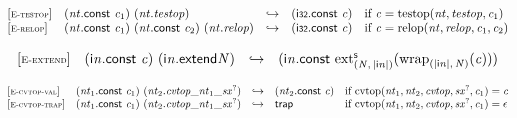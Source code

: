 \vspace{1ex}

$$
\begin{array}{@{}l@{}lcl@{}l@{}}
{[\textsc{\scriptsize E{-}testop}]} \quad & ({\mathit{nt}}.\mathsf{const}~{\mathit{c}}_{{1}})~({\mathit{nt}} . {\mathit{testop}}) &\hookrightarrow& (\mathsf{i{\scriptstyle32}}.\mathsf{const}~{\mathit{c}}) &\quad
  \mbox{if}~{\mathit{c}} = {\mathrm{testop}}({\mathit{nt}}, {\mathit{testop}}, {\mathit{c}}_{{1}}) \\
{[\textsc{\scriptsize E{-}relop}]} \quad & ({\mathit{nt}}.\mathsf{const}~{\mathit{c}}_{{1}})~({\mathit{nt}}.\mathsf{const}~{\mathit{c}}_{{2}})~({\mathit{nt}} . {\mathit{relop}}) &\hookrightarrow& (\mathsf{i{\scriptstyle32}}.\mathsf{const}~{\mathit{c}}) &\quad
  \mbox{if}~{\mathit{c}} = {\mathrm{relop}}({\mathit{nt}}, {\mathit{relop}}, {\mathit{c}}_{{1}}, {\mathit{c}}_{{2}}) \\
\end{array}
$$

\vspace{1ex}

$$
\begin{array}{@{}l@{}lcl@{}l@{}}
{[\textsc{\scriptsize E{-}extend}]} \quad & ({\mathsf{i}}{{\mathit{n}}}.\mathsf{const}~{\mathit{c}})~({{\mathsf{i}}{{\mathit{n}}}.\mathsf{extend}}{{\mathit{N}}}) &\hookrightarrow& ({\mathsf{i}}{{\mathit{n}}}.\mathsf{const}~{{{{\mathrm{ext}}}_{({\mathit{N}},\, {|{\mathsf{i}}{{\mathit{n}}}|})}^{\mathsf{s}}}}{({{{\mathrm{wrap}}}_{({|{\mathsf{i}}{{\mathit{n}}}|},\, {\mathit{N}})}}{({\mathit{c}})})}) &  \\
\end{array}
$$

\vspace{1ex}

$$
\begin{array}{@{}l@{}lcl@{}l@{}}
{[\textsc{\scriptsize E{-}cvtop{-}val}]} \quad & ({\mathit{nt}}_{{1}}.\mathsf{const}~{\mathit{c}}_{{1}})~({\mathit{nt}}_{{2}} . {{{{{\mathit{cvtop}}}{\mathsf{\_}}}{{\mathit{nt}}_{{1}}}}{\mathsf{\_}}}{{{\mathit{sx}}^?}}) &\hookrightarrow& ({\mathit{nt}}_{{2}}.\mathsf{const}~{\mathit{c}}) &\quad
  \mbox{if}~{\mathrm{cvtop}}({\mathit{nt}}_{{1}}, {\mathit{nt}}_{{2}}, {\mathit{cvtop}}, {{\mathit{sx}}^?}, {\mathit{c}}_{{1}}) = {\mathit{c}} \\
{[\textsc{\scriptsize E{-}cvtop{-}trap}]} \quad & ({\mathit{nt}}_{{1}}.\mathsf{const}~{\mathit{c}}_{{1}})~({\mathit{nt}}_{{2}} . {{{{{\mathit{cvtop}}}{\mathsf{\_}}}{{\mathit{nt}}_{{1}}}}{\mathsf{\_}}}{{{\mathit{sx}}^?}}) &\hookrightarrow& \mathsf{trap} &\quad
  \mbox{if}~{\mathrm{cvtop}}({\mathit{nt}}_{{1}}, {\mathit{nt}}_{{2}}, {\mathit{cvtop}}, {{\mathit{sx}}^?}, {\mathit{c}}_{{1}}) = \epsilon \\
\end{array}
$$

